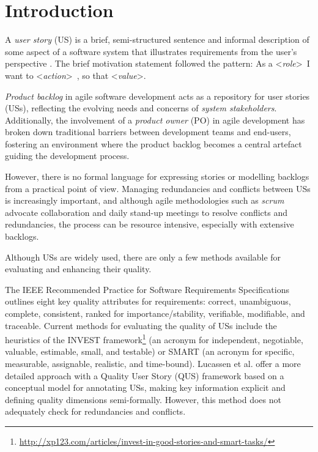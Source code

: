 \section{Introduction}\label{intro}
A \emph{user story} (US) is a brief, semi-structured sentence and informal description of some aspect of a software system that illustrates requirements from the user’s perspective \cite{raharjana2021user}. The brief motivation statement followed the pattern:  As a  \textless\emph{role}\textgreater\ I want to \textless\emph{action}\textgreater\ , so that \textless\emph{value}\textgreater.

\emph{Product backlog} in agile software development acts as a repository for user stories (USs), reflecting the evolving needs and concerns of \emph{system stakeholders}\cite{sedano2019product}. Additionally, the involvement of a \emph{product owner} (PO) in agile development has broken down traditional barriers between development teams and end-users, fostering an environment where the product backlog becomes a central artefact guiding the development process\cite{sedano2019product}. 

However, there is no formal language for expressing stories or modelling backlogs from a practical point of view. Managing redundancies and conflicts between USs is increasingly important, and although agile methodologies such as \emph{scrum} advocate collaboration and daily stand-up meetings to resolve conflicts and redundancies, the process can be resource intensive, especially with extensive backlogs.

Although USs are widely used, there are only a few methods available for evaluating and enhancing their quality.

The IEEE Recommended Practice for Software Requirements Specifications outlines eight key quality attributes for requirements\cite{doe2011recommended}: correct, unambiguous, complete, consistent, ranked for importance/stability, verifiable, modifiable, and traceable. Current methods for evaluating the quality of USs include the heuristics of the INVEST framework\footnote{\href{http://xp123.com/articles/invest-in-good-stories-and-smart-tasks/}{http://xp123.com/articles/invest-in-good-stories-and-smart-tasks/}} (an acronym for independent, negotiable, valuable, estimable, small, and testable) or SMART (an acronym for specific, measurable, assignable, realistic, and time-bound). Lucassen et al. offer a more detailed approach with a Quality User Story (QUS) framework based on a conceptual model for annotating USs\cite{Lucassen2015}, making key information explicit and defining quality dimensions semi-formally. However, this method does not adequately check for redundancies and conflicts.

